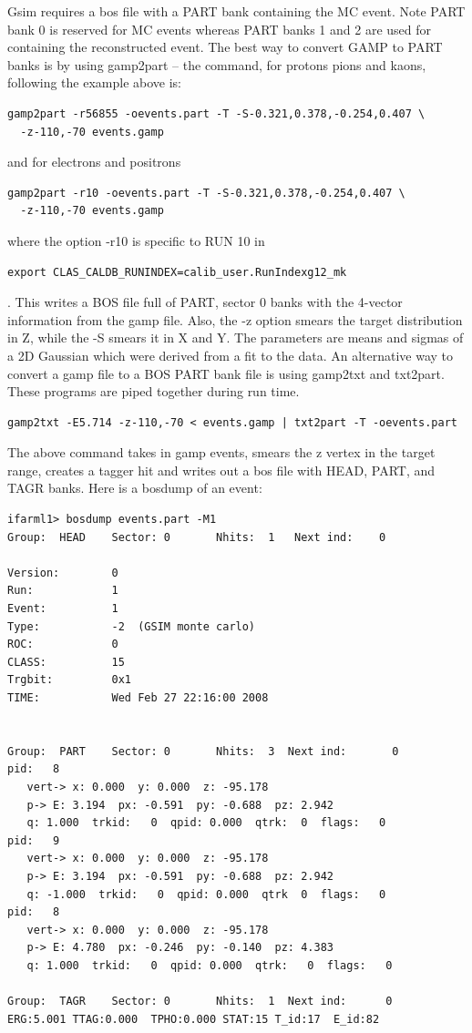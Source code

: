 Gsim requires a bos file with a PART bank containing the MC event. Note PART bank 0 is reserved for MC events whereas PART banks 1 and 2 are used for containing the reconstructed event. The best way to convert GAMP to PART banks is by using gamp2part -- the command, for protons pions and kaons, following the example above is:
\begin{verbatim}
gamp2part -r56855 -oevents.part -T -S-0.321,0.378,-0.254,0.407 \
  -z-110,-70 events.gamp
\end{verbatim}
and for electrons and positrons
\begin{verbatim}
gamp2part -r10 -oevents.part -T -S-0.321,0.378,-0.254,0.407 \
  -z-110,-70 events.gamp
\end{verbatim}
where the option -r10 is specific to RUN 10 in
\begin{verbatim}
export CLAS_CALDB_RUNINDEX=calib_user.RunIndexg12_mk
\end{verbatim}.
This writes a BOS file full of PART, sector 0 banks with the 4-vector information from the gamp file. Also, the -z option smears the target distribution in Z, while the -S smears it in X and Y. The parameters are means and sigmas of a 2D Gaussian which were derived from a fit to the data. An alternative way to convert a gamp file to a BOS PART bank file is using gamp2txt and txt2part. These programs are piped together during run time.
\begin{verbatim}
gamp2txt -E5.714 -z-110,-70 < events.gamp | txt2part -T -oevents.part
\end{verbatim}
The above command takes in gamp events, smears the z vertex in the target range, creates a tagger hit and writes out a bos file with HEAD, PART, and TAGR banks. Here is a bosdump of an event:
\begin{verbatim}
ifarml1> bosdump events.part -M1
Group:  HEAD    Sector: 0       Nhits:  1   Next ind:    0

Version:        0
Run:            1
Event:          1
Type:           -2  (GSIM monte carlo)
ROC:            0
CLASS:          15
Trgbit:         0x1
TIME:           Wed Feb 27 22:16:00 2008


Group:  PART    Sector: 0       Nhits:  3  Next ind:       0
pid:   8
   vert-> x: 0.000  y: 0.000  z: -95.178
   p-> E: 3.194  px: -0.591  py: -0.688  pz: 2.942
   q: 1.000  trkid:   0  qpid: 0.000  qtrk:  0  flags:   0
pid:   9
   vert-> x: 0.000  y: 0.000  z: -95.178
   p-> E: 3.194  px: -0.591  py: -0.688  pz: 2.942
   q: -1.000  trkid:   0  qpid: 0.000  qtrk  0  flags:   0
pid:   8
   vert-> x: 0.000  y: 0.000  z: -95.178
   p-> E: 4.780  px: -0.246  py: -0.140  pz: 4.383
   q: 1.000  trkid:   0  qpid: 0.000  qtrk:   0  flags:   0

Group:  TAGR    Sector: 0       Nhits:  1  Next ind:      0
ERG:5.001 TTAG:0.000  TPHO:0.000 STAT:15 T_id:17  E_id:82
\end{verbatim}

